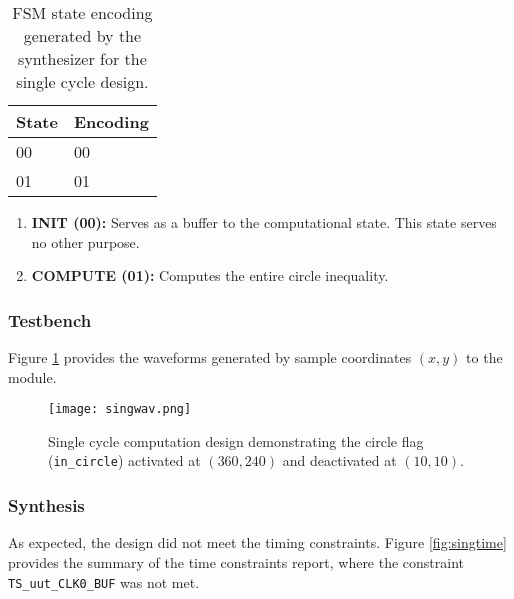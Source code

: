 \documentclass[paper=usletter, fontsize=12pt]{article}
\begin{document}
        \begin{table}[h]
            \caption{FSM state encoding generated by the synthesizer for the
            single cycle design.}
            \label{table:singlefsmcode}
            \centering
            \begin{tabular}{ m{5em}m{5em} }
                \hline
                \textbf{State}  &            \textbf{Encoding} \\
                \hline
                00              &            00 \\
                01              &            01 \\
                \hline
            \end{tabular}
        \end{table}

        \begin{enumerate}

            \item \textbf{INIT (00): } Serves as a buffer to the computational
            state. This state serves no other purpose.

            \item \textbf{COMPUTE (01): } Computes the entire circle
            inequality.

        \end{enumerate}

        \subsubsection{Testbench} Figure \ref{fig:singwav} provides the
        waveforms generated by sample coordinates $(x, y)$ to the module.
        \begin{figure}[ht]
            \begin{center}
                \texttt{[image: singwav.png]}
                \caption{Single cycle computation design demonstrating the
                circle flag (\texttt{in\_circle}) activated at $(360, 240)$ and
                deactivated at $(10,10)$.}
                \label{fig:singwav}
            \end{center}
        \end{figure}
        \newpage

        \subsubsection{Synthesis} As expected, the design did not meet the
        timing constraints. Figure \ref{fig:singtime} provides the summary of
        the time constraints report, where the constraint
        \texttt{TS\_uut\_CLK0\_BUF} was not met.
\end{document}
